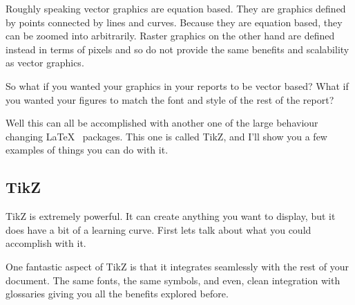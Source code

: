 \documentclass[hidelinks, float=false, crop=false]{article}
\begin{document}
        Roughly speaking vector graphics are equation based. They are graphics defined by points 
        connected by lines and curves. Because they are equation based, they can be zoomed into
        arbitrarily. Raster graphics on the other hand are defined instead in terms of pixels and 
        so do not provide the same benefits and scalability as vector graphics.

        So what if you wanted your graphics in your reports to be vector based? What if you wanted
        your figures to match the font and style of the rest of the report? 

        Well this can all be accomplished with another one of the large behaviour changing \LaTeX~
        packages. This one is called TikZ, and I'll show you a few examples of things you can do
        with it.

        \subsection{TikZ}
            TikZ is extremely powerful. It can create anything you want to display, but it does have
            a bit of a learning curve. First lets talk about what you could accomplish with it.

            One fantastic aspect of TikZ is that it integrates seamlessly with the rest of your
            document. The same fonts, the same symbols, and even, clean integration with glossaries
            giving you all the benefits explored before. 
\end{document}
